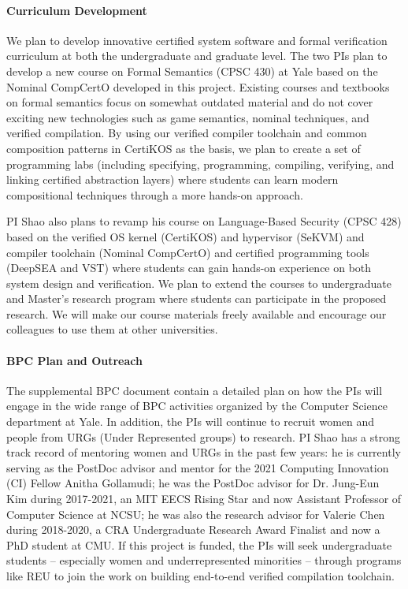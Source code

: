 \paragraph*{Curriculum Development}
We plan to develop innovative certified system software and formal
verification curriculum at both the undergraduate and graduate
level. The two PIs plan to develop a new course on Formal Semantics
(CPSC 430) at Yale based on the Nominal CompCertO developed in this
project. Existing courses and textbooks on formal semantics focus on
somewhat outdated material and do not cover exciting new technologies
such as game semantics, nominal techniques, and verified
compilation. By using our verified compiler toolchain and common
composition patterns in CertiKOS as the basis, we plan to
create a set of programming labs (including specifying, programming,
compiling, verifying, and linking certified abstraction layers) where
students can learn modern compositional techniques through a more
hands-on approach.

PI Shao also plans to revamp his course on Language-Based Security
(CPSC 428) based on the verified OS kernel (CertiKOS) and hypervisor
(SeKVM) and compiler toolchain (Nominal CompCertO) and certified
programming tools (DeepSEA and VST) where students can gain hands-on
experience on both system design and verification. We plan to extend
the courses to undergraduate and Master's research program where
students can participate in the proposed research. We will make our
course materials freely available and encourage our colleagues to use
them at other universities.

\vspace*{-2ex}
\paragraph*{BPC Plan and Outreach}
The supplemental BPC document contain a detailed plan on how the PIs
will engage in the wide range of BPC activities organized by the
Computer Science department at Yale. In addition, the PIs will
continue to recruit women and people from URGs (Under Represented
groups) to research.  PI Shao has a strong track record of mentoring
women and URGs in the past few years: he is currently serving as the
PostDoc advisor and mentor for the 2021 Computing Innovation (CI)
Fellow Anitha Gollamudi; he was the PostDoc advisor for Dr. Jung-Eun
Kim during 2017-2021, an MIT EECS Rising Star and now Assistant
Professor of Computer Science at NCSU; he was also the research
advisor for Valerie Chen during 2018-2020, a CRA Undergraduate
Research Award Finalist and now a PhD student at CMU.  If this project
is funded, the PIs will seek undergraduate students – especially women
and underrepresented minorities – through programs like REU to join
the work on building end-to-end verified compilation toolchain.


